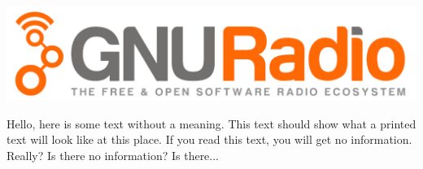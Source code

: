 \documentclass[11pt]{article}
\begin{document}
\includegraphics[width=0.9\linewidth]{gnuradio_logo_web}
\begin{multicols}{3}
Hello, here is some text without a meaning.  This text should show what 
a printed text will look like at this place.
If you read this text, you will get no information.  Really?  Is there 
no information?  Is there...
\end{multicols}
 
\end{document}
